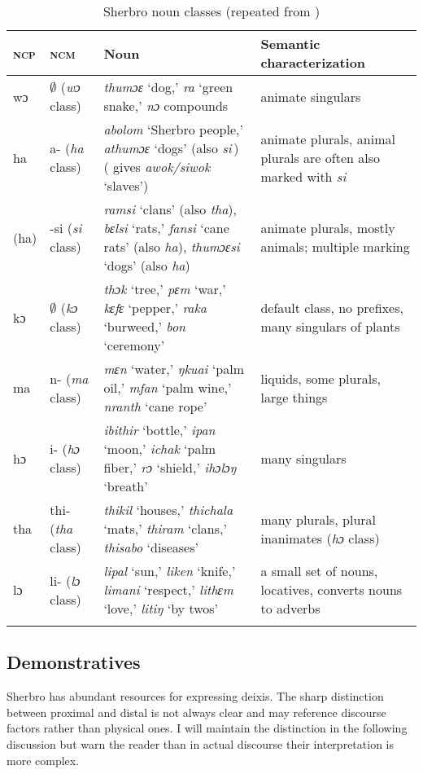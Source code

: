 \begin{table}
\caption{\label{tab:wordcat:15}Sherbro noun classes (repeated from )}
\small
\begin{tabularx}{\textwidth}{llQQ}
\lsptoprule
\textsc{ncp} & \textsc{ncm} & Noun & Semantic characterization\\
\midrule
 wɔ & $\emptyset$ (\textit{wɔ} class) & \textit{thumɔɛ} ‘dog,' \textit{ra} ‘green snake,' \textit{nɔ} compounds & animate singulars\\
 ha & a- (\textit{ha} class) & \textit{abolom} ‘Sherbro people,' \textit{athumɔɛ} ‘dogs' (also \textit{si}\,) (\citet{Sumner1921} gives \textit{awok/siwok} ‘slaves') & animate plurals, animal plurals are often also marked with \textit{si}\\
 (ha) & {}-si (\textit{si} class) & \textit{ramsi} ‘clans' (also \textit{tha}), \textit{bɛlsi} ‘rats,' \textit{fansi} ‘cane rats' (also \textit{ha}), \textit{thumɔɛsi} ‘dogs' (also \textit{ha}) & animate plurals, mostly animals; multiple marking\\
 kɔ & $\emptyset$ (\textit{kɔ} class) & \textit{thɔk} ‘tree,' \textit{pɛm} ‘war,' \textit{kɛfɛ} ‘pepper,' \textit{raka} ‘burweed,' \textit{bon} ‘ceremony' & default class, no prefixes, many singulars of plants\\
 ma & n- (\textit{ma} class) & \textit{mɛn} ‘water,' \textit{ŋkuai} ‘palm oil,' \textit{mfan} ‘palm wine,' \textit{nranth} ‘cane rope' & liquids, some plurals, large things\\
 hɔ & i- (\textit{hɔ} class) & \textit{ibithir} ‘bottle,' \textit{ipan} ‘moon,' \textit{ichak} ‘palm fiber,' \textit{rɔ} ‘shield,' \textit{ihɔlɔŋ} ‘breath' & many singulars\\
 tha & thi- (\textit{tha} class) & \textit{thikil} ‘houses,' \textit{thichala} ‘mats,' \textit{thiram} ‘clans,' \textit{thisabo} ‘diseases' & many plurals, plural inanimates (\textit{hɔ} class)\\
 lɔ & li- (\textit{lɔ} class) & \textit{lipal} ‘sun,' \textit{liken} ‘knife,' \textit{limani} ‘respect,' \textit{lithɛm} ‘love,' \textit{litiŋ} ‘by twos' & a small set of nouns, locatives, converts nouns to adverbs\\
\lspbottomrule
\end{tabularx}
\end{table}

\subsection{Demonstratives}
\label{sec:3.3.3}\hypertarget{Toc115517765}{}
Sherbro has abundant resources for expressing deixis. The sharp distinction between proximal and distal is not always clear and may reference discourse factors rather than physical ones. I will maintain the distinction in the following discussion but warn the reader than in actual discourse their interpretation is more complex.

